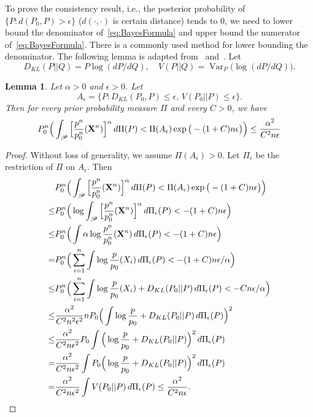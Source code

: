 \documentclass[3p]{elsarticle}
\DeclareMathOperator{\myVar}{Var}
\theoremstyle{plain}
\newtheorem{lemma}{\quad\quad Lemma}
\theoremstyle{definition}
\theoremstyle{remark}
\begin{document}
To prove the consistency result, i.e., the posterior probability of $\{P:d(P_0, P)>\epsilon\}$ ($d(\cdot,\cdot)$ is certain distance) tends to $0$, we need to lower bound the denominator of~\eqref{eq:BayesFormula} and upper bound the numerator of~\eqref{eq:BayesFormula}.
There is a commonly used method for lower bounding the denominator.
The following lemma is adapted from~\cite{ghosal2000} and~\cite{Shen2001Rates}.
Let 
$$D_{KL}(P||Q)=P\log ({dP}/{dQ}),\quad V(P||Q)=\myVar_P \big(\log(dP/dQ)\big).$$
\begin{lemma}\label{lemma:denominator}
    Let $\alpha>0$ and $\epsilon>0$.
    Let 
    $$A_\epsilon=\{ P:  D_{KL}(P_0, P)\leq \epsilon,\, V(P_0||P)\leq \epsilon\}.$$
Then for every prior probability measure $\Pi$ and every $C>0$, we have
$$
    P_0^n\Big(
    \int_{\mathscr{P}} \Big[\frac{p^n}{p^n_0} (\mathbf{X}^n ) \Big]^\alpha \, d \Pi(P)
    <
    \Pi(A_\epsilon)
    \exp\big(-(1+C)n\epsilon\big)
    \Big)\leq \frac{\alpha^2}{C^2 n \epsilon}    
$$
\end{lemma}
\begin{proof}
    Without loss of generality, we assume $\Pi(A_{\epsilon})>0$.
    Let $\Pi_{\epsilon}$ be the restriction of $\Pi$ on $A_{\epsilon}$.
    Then
$$
    \begin{aligned}
        &P_0^n\Big(
        \int_{\mathscr{P}} \Big[\frac{p^n}{p^n_0} (\mathbf{X}^n)\Big]^\alpha \, d \Pi(P)
    <
    \Pi(A_\epsilon)
    \exp\big(-(1+C)n\epsilon\big)
    \Big)\\
        \leq &
    P_0^n\Big(
        \log \int_{\mathscr{P}} \Big[\frac{p^n}{p^n_0} (\mathbf{X}^n)\Big]^\alpha \, d \Pi_\epsilon (P)
    <
    -(1+C)n\epsilon\Big)\\
        \leq &
    P_0^n\Big(
     \int \alpha \log \frac{p^n}{p^n_0} (\mathbf{X}^n) \, d \Pi_\epsilon (P)
    <
    -(1+C)n\epsilon\Big)\\
        = &
    P_0^n\Big(
        \sum_{i=1}^n \int \log \frac{p}{p_0} (X_i) \, d \Pi_\epsilon (P)
    <
    -(1+C)n\epsilon/\alpha\Big)\\
        \leq &
    P_0^n\Big(
        \sum_{i=1}^n \int \log \frac{p}{p_0} (X_i) +  D_{KL}(P_0||P)\, d \Pi_\epsilon (P)
    <
    -Cn\epsilon/\alpha\Big)\\
        \leq &
        \frac{\alpha^2}{C^2 n^2 \epsilon^2}
        {n}
        P_0 \Big( \int \log \frac{p}{p_0}  +  D_{KL}(P_0 || P)\, d\Pi_\epsilon (P)  \Big)^2\\
        \leq &
        \frac{\alpha^2}{C^2 n \epsilon^2}
        P_0  \int \Big(\log \frac{p}{p_0}  +  D_{KL}(P_0 || P)\Big)^2\, d\Pi_\epsilon (P)  \\
        = &
        \frac{\alpha^2}{C^2 n \epsilon^2}
          \int P_0\Big(\log \frac{p}{p_0}  +  D_{KL}(P_0 || P)\Big)^2\, d\Pi_\epsilon (P)  \\
        = &
        \frac{\alpha^2}{C^2 n \epsilon^2}
          \int V(P_0|| P)\, d\Pi_\epsilon (P)  
        \leq 
        \frac{\alpha^2}{C^2 n \epsilon}.
    \end{aligned}
$$
\end{proof}
\end{document}
